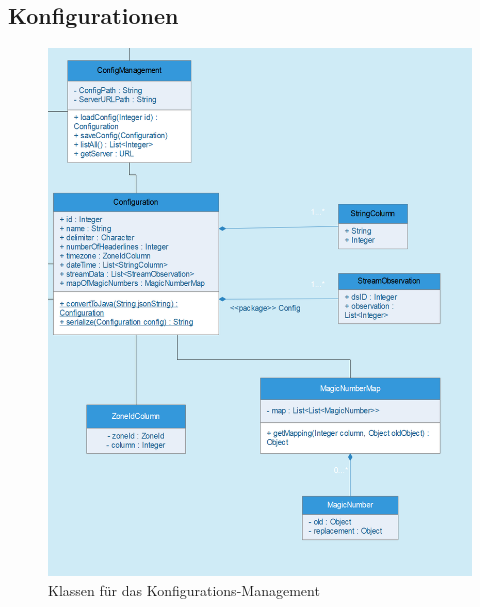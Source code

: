 \subsection{Konfigurationen}
\begin{figure}[!h]
\centering
\includegraphics[scale=0.6]{uml/screenshots/configuration}
\caption{Klassen für das Konfigurations-Management}
\end{figure}
\clearpage


\clearpage

\clearpage



\clearpage
